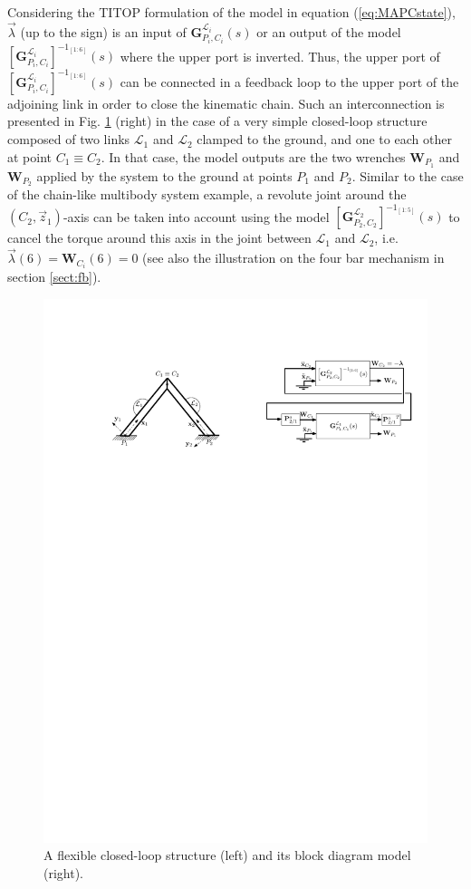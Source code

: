 \documentclass[smallcondensed]{svjour3}     %
\begin{document}
Considering the TITOP formulation of the model in equation (\ref{eq:MAPCstate}), $\vec{\lambda}$ (up to the sign) is an input of $\mathbf{G}_{P_i,C_i}^{\mathcal{L}_i}(s)$ or an output of the model $\left[\mathbf{G}_{P_i,C_i}^{\mathcal{L}_i}\right]^{-1_{[1:6]}}(s)$ where the upper port is inverted. Thus, the upper port of $\left[\mathbf{G}_{P_i,C_i}^{\mathcal{L}_i}\right]^{-1_{[1:6]}}(s)$ can be connected in a feedback loop to the upper port of the adjoining link in order to close the kinematic chain. Such an interconnection is presented in Fig. \ref{fig:2bodies} (right) in the case of a very simple closed-loop structure composed of two links $\mathcal{L}_1$ and $\mathcal{L}_2$ clamped to the ground, and one to each other at point $C_1 \equiv C_2$. In that case, the model outputs are the two wrenches $\mathbf{W}_{P_1}$ and $\mathbf{W}_{P_2}$ applied by the system to the ground at points $P_1$ and $P_2$. Similar to the case of the chain-like multibody system example, a revolute joint around the $(C_2,\vec{z}_1)$-axis can be taken into account using the model $\left[\mathbf{G}_{P_2,C_2}^{\mathcal{L}_2}\right]^{-1_{[1:5]}}(s)$ to cancel the torque around this axis in the joint between $\mathcal{L}_1$ and $\mathcal{L}_2$, i.e. $\vec{\lambda}(6)=\mathbf{W}_{C_i}(6)=0$ (see also the illustration on the four bar mechanism in section \ref{sect:fb}). 
\begin{figure}[htbp!]
  \includegraphics[width=\textwidth]{2bodies}
\caption{A flexible closed-loop structure (left) and its block diagram model (right).}
\label{fig:2bodies} 
\end{figure}
\end{document}
